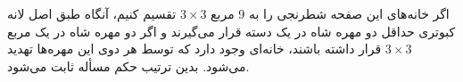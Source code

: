     اگر خانه‌های این صفحه شطرنجی را به 9 مربع
    $3\times3$
    تقسیم کنیم، آنگاه طبق اصل لانه کبوتری حداقل دو مهره شاه در یک دسته قرار می‌گیرند و اگر دو مهره شاه در یک مربع 
    $3\times3$
    قرار داشته باشند، خانه‌ای وجود دارد که توسط هر دوی این مهره‌ها تهدید می‌شود. بدین ترتیب حکم مسأله ثابت می‌شود.